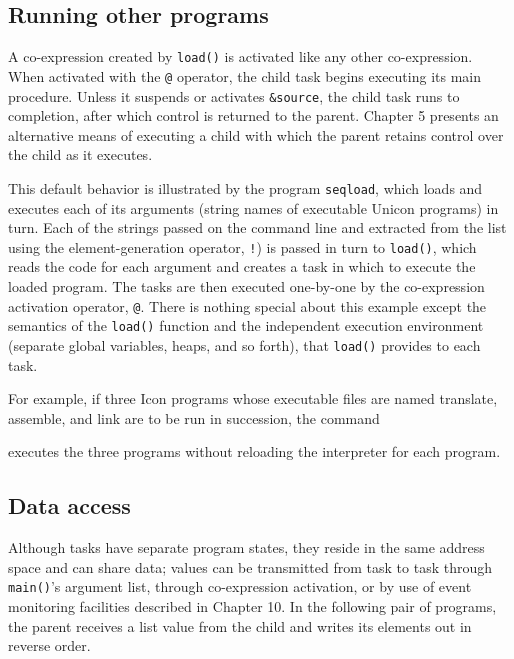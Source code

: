 \subsection{Running other programs}

A co-expression created by {\texttt{load()}} is
activated like any other co-expression. When activated with the
{\texttt{@}} operator, the child task begins
executing its main procedure. Unless it suspends or activates
{\texttt{\&source}}, the child task runs to
completion, after which control is returned to the parent. Chapter 5
presents an alternative means of executing a child with which the
parent retains control over the child as it executes. 

This default behavior is illustrated by the program
\texttt{seqload}, which loads and executes each
of its arguments (string names of executable Unicon programs) in turn.
Each of the strings passed on the command line and extracted from the
list using the element-generation operator,
{\texttt{!}}) is passed in turn to
{\texttt{load()}}, which reads the code for each argument
and creates a task in which to execute the loaded program. The tasks
are then executed one-by-one by the co-expression activation operator,
{\texttt{@}}. There is
nothing special about this example except the semantics of the
{\texttt{load()}} function and the independent
execution environment (separate global variables, heaps, and so forth),
that {\texttt{load()}} provides to each task. 


For example, if three Icon programs whose executable files are named
translate, assemble, and link are to be run in succession, the command 


\noindent
executes the three programs without reloading the interpreter for each
program. 

\subsection{Data access}

Although tasks have separate program states, they reside in the same
address space and can share data; values can be transmitted from task
to task through {\texttt{main()}}'s argument list, through
co-expression activation, or by use of event monitoring facilities
described in Chapter 10. In the following pair of programs, the
parent receives a list value from the child and writes its elements
out in reverse order.

